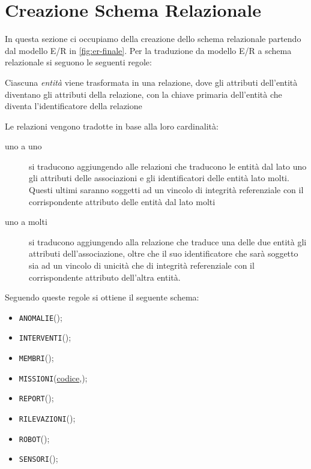 \section{Creazione Schema Relazionale}
In questa sezione ci occupiamo della creazione dello schema relazionale partendo dal
modello E/R in \ref{fig:er-finale}. Per la traduzione da modello E/R a schema relazionale
si seguono le seguenti regole:
\begin{enumarate}
\item Ciascuna \textit{entità} viene trasformata in una relazione,
  dove gli attributi dell'entità diventano gli attributi della
  relazione, con la chiave primaria dell'entità che diventa
  l'identificatore della relazione
\item Le relazioni vengono tradotte in base alla loro cardinalità:
  \begin{description}
  \item[uno a uno] si traducono aggiungendo alle relazioni che traducono le entità dal lato uno gli
    attributi delle associazioni e gli identificatori delle entità lato molti. Questi ultimi saranno soggetti
    ad un vincolo di integrità referenziale con il corrispondente attributo delle entità dal lato molti
  \item[uno a molti] si traducono aggiungendo alla relazione che traduce una delle due entità gli attributi
    dell’associazione, oltre che il suo identificatore che sarà soggetto sia ad un vincolo di unicità
    che di integrità referenziale con il corrispondente attributo dell’altra entità.
  \end{description}
\end{enumarate}

Seguendo queste regole si ottiene il seguente schema:
\begin{itemize}
\item \texttt{ANOMALIE}();
\item \texttt{INTERVENTI}();
\item \texttt{MEMBRI}();
\item \texttt{MISSIONI}(\underline{codice},);
\item \texttt{REPORT}();
\item \texttt{RILEVAZIONI}();
\item \texttt{ROBOT}();
\item \texttt{SENSORI}();
\end{itemize}

